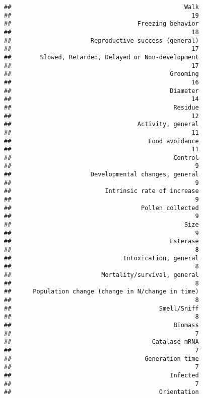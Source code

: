 \documentclass[]{article}
\begin{document}
\begin{verbatim}
##                                                Walk 
##                                                  19 
##                                   Freezing behavior 
##                                                  18 
##                      Reproductive success (general) 
##                                                  17 
##        Slowed, Retarded, Delayed or Non-development 
##                                                  17 
##                                            Grooming 
##                                                  16 
##                                            Diameter 
##                                                  14 
##                                             Residue 
##                                                  12 
##                                   Activity, general 
##                                                  11 
##                                      Food avoidance 
##                                                  11 
##                                             Control 
##                                                   9 
##                      Developmental changes, general 
##                                                   9 
##                          Intrinsic rate of increase 
##                                                   9 
##                                    Pollen collected 
##                                                   9 
##                                                Size 
##                                                   9 
##                                            Esterase 
##                                                   8 
##                               Intoxication, general 
##                                                   8 
##                         Mortality/survival, general 
##                                                   8 
##      Population change (change in N/change in time) 
##                                                   8 
##                                         Smell/Sniff 
##                                                   8 
##                                             Biomass 
##                                                   7 
##                                       Catalase mRNA 
##                                                   7 
##                                     Generation time 
##                                                   7 
##                                            Infected 
##                                                   7 
##                                         Orientation 

\end{verbatim}
\end{document}
